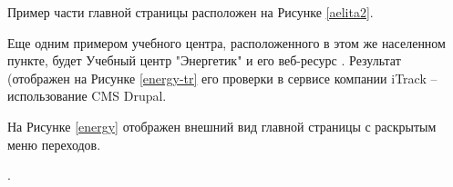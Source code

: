 
Пример части главной страницы расположен на Рисунке \ref{aelita2}.


Еще одним примером учебного центра, расположенного в этом же населенном пункте, будет Учебный центр "Энергетик" и его веб-ресурс \cite{energy}.
Результат (отображен на Рисунке \ref{energy-tr} его проверки в сервисе компании iTrack -- использование CMS Drupal.


На Рисунке \ref{energy} отображен внешний вид главной страницы с раскрытым меню переходов.

.


\clearpage
